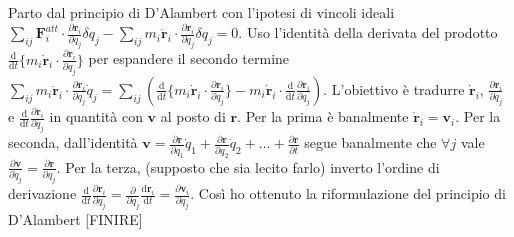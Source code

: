 \documentclass[10pt,a4paper]{article}
\newcommand{\de}{\mathrm d}
\newcommand{\fracd}[2]{\frac{\de #1}{\de #2}}
\newcommand{\fracp}[2]{\frac{\partial #1}{\partial #2}}
\begin{document}
	\section{}
Parto dal principio di D'Alambert con l'ipotesi di vincoli ideali $\sum_{ij} \mathbf F^{att}_i \cdot \fracp{\mathbf r_i}{q_j} \delta q_j - \sum_{ij}  m_i \ddot{\mathbf r}_i \cdot \fracp{\mathbf r_i}{q_j} \delta q_j = 0$. Uso l'identità della derivata del prodotto $\fracd{}{t}\{m_i \dot{\mathbf r}_i \cdot \fracp{\mathbf r_i}{q_j}\}$ per espandere il secondo termine $\sum_{ij} m_i \ddot{\mathbf r}_i \cdot \fracp{\mathbf r_i}{q_j} \dot q_j = \sum_{ij} (\fracd{}{t}\{m_i \dot{\mathbf r}_i \cdot \fracp{\mathbf r_i}{q_j}\} - m_i \dot{\mathbf r}_i \cdot \fracd{}{t}\fracp{\mathbf r_i}{q_j})$. L'obiettivo è tradurre $\dot{\mathbf r}_i$, $
\fracp{\mathbf r_i}{q_j}$ e $\fracd{}{t}\fracp{\mathbf r_i}{q_j}$ in quantità con $\mathbf v$ al posto di $\mathbf r$. Per la prima è banalmente $\dot{\mathbf r}_i = \mathbf v_i$. Per la seconda, dall'identità $\mathbf v = \fracp{\mathbf r}{q_1} \dot q_1 + \fracp{\mathbf r}{q_2} \dot q_2 + \dots + \fracp{\mathbf r}{t}$ segue banalmente che $\forall j$ vale $\fracp{\mathbf v}{\dot q_j} = \fracp{\mathbf r}{q_j}$. Per la terza, (supposto che sia lecito farlo) inverto l'ordine di derivazione $\fracd{}{t}\fracp{\mathbf r_i}{q_j} = \fracp{}{q_j} \fracd{\mathbf r_i}{t} = \fracp{\mathbf v_i}{q_j}$. Così ho ottenuto la riformulazione del principio di D'Alambert [FINIRE]
 
	
\end{document}
